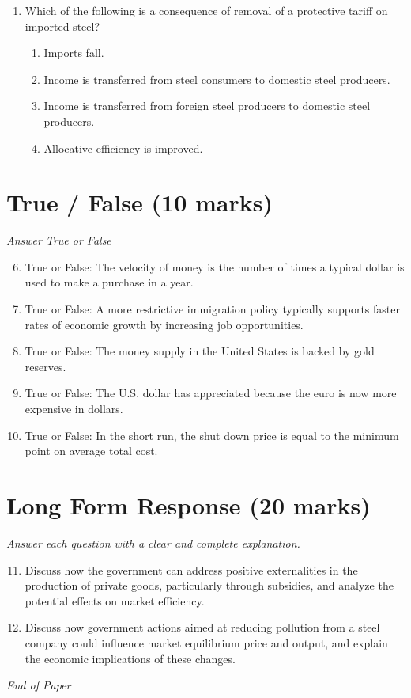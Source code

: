 \documentclass[12pt]{article}
\begin{document}
\begin{enumerate}[label=\arabic*.]
\begin{enumerate}[label=(\alph*)]
    \item changes in the money supply do not have significant effects.
    \item fiscal policy is the preferred way of shifting the aggregate demand curve.
    \item the FED should allow the money supply to grow at a constant rate.
\end{enumerate}
\item Which of the following is a consequence of removal of a protective tariff on imported steel?
\begin{enumerate}[label=(\alph*)]
    \item Imports fall.
    \item Income is transferred from steel consumers to domestic steel producers.
    \item Income is transferred from foreign steel producers to domestic steel producers.
    \item Allocative efficiency is improved.
\end{enumerate}
\end{enumerate}

\section*{True / False (10 marks)}
\textit{Answer True or False}
\begin{enumerate}[label=\arabic*.]
\setcounter{enumi}{5}
\item True or False: The velocity of money is the number of times a typical dollar is used to make a purchase in a year.
\item True or False: A more restrictive immigration policy typically supports faster rates of economic growth by increasing job opportunities.
\item True or False: The money supply in the United States is backed by gold reserves.
\item True or False: The U.S. dollar has appreciated because the euro is now more expensive in dollars.
\item True or False: In the short run, the shut down price is equal to the minimum point on average total cost.
\end{enumerate}

\section*{Long Form Response (20 marks)}
\textit{Answer each question with a clear and complete explanation.}
\begin{enumerate}[label=\arabic*.]
\setcounter{enumi}{10}
\item Discuss how the government can address positive externalities in the production of private goods, particularly through subsidies, and analyze the potential effects on market efficiency.
\item Discuss how government actions aimed at reducing pollution from a steel company could influence market equilibrium price and output, and explain the economic implications of these changes.
\end{enumerate}

\vfill
\noindent\textit{End of Paper}
\end{document}
